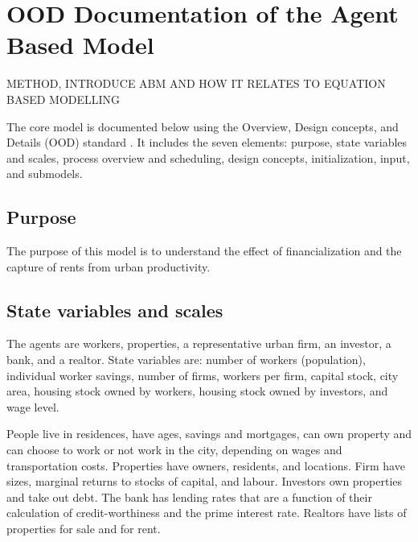 
\chapter{OOD Documentation of the Agent Based Model} \label{appendix-odd}


METHOD, INTRODUCE ABM AND HOW IT RELATES TO EQUATION BASED MODELLING

The core model is documented below using the Overview, Design concepts, and Details (OOD) standard \cite{grimmODDProtocolDescribing2020, grimmODDProtocolReview2010a}. It includes the seven elements: purpose, state variables and scales, process overview and scheduling, design concepts, initialization, input, and submodels.

\section{Purpose}

The purpose of this model is to understand the effect of financialization and the capture of rents from urban productivity. %


\section{State variables and scales}

The agents are workers,  %
properties, a representative urban firm, an investor, a bank, and a realtor. 
State variables are: number of workers (population), individual worker savings, number of firms, workers per firm, capital stock, city area, housing stock owned by workers, housing stock owned by investors, and wage level.

People live in residences, have ages, savings and mortgages, can own property and can choose to work or not work in the city, depending on wages and transportation costs. Properties have owners, residents, and locations. Firm have sizes, marginal returns to stocks of capital, and labour.  
Investors own properties and take out debt. The bank has lending rates that are a function of their calculation of credit-worthiness and the prime interest rate. Realtors have lists of properties for sale and for rent. 

